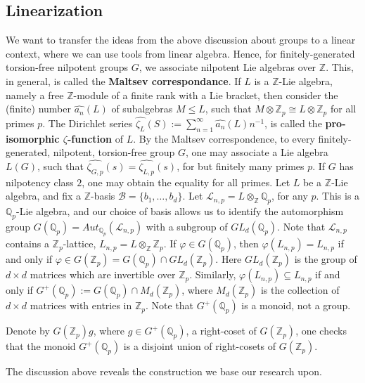 \documentclass[12pt]{article}
\begin{document}
\subsection{Linearization}
We want to transfer the ideas from the above discussion about groups to a linear context, where we can use tools from linear algebra.
Hence, for finitely-generated torsion-free nilpotent groups $G$, we associate nilpotent Lie algebras over $\mathbb{Z}$. This, in general, is called the \textbf{Maltsev correspondance}. 
If $L$ is a $\mathbb{Z}$-Lie algebra, namely a free $\mathbb{Z}$-module of a finite rank with a Lie bracket, then consider the (finite) number $\hat{a_n}(L)$ of subalgebras $M\leq L$, such that $M\otimes\mathbb{Z}_p\cong L\otimes\mathbb{Z}_p$ for all primes $p$. The Dirichlet series $\hat{\zeta_L}(S):=\sum_{n=1}^{\infty}\hat{a_n}(L)n^{-1}$, is called the \textbf{pro-isomorphic $\zeta$-function} of $L$. By the Maltsev correspondence, to every finitely-generated, nilpotent, torsion-free group $G$, one may associate a Lie algebra $L(G)$, such that $\hat{\zeta_{G,p}}(s)=\hat{\zeta_{L,p}}(s)$, for but finitely many primes $p$. If $G$ has nilpotency class $2$, one may obtain the equality for all primes. Let $L$ be a $\mathbb{Z}$-Lie algebra, and fix a $\mathbb{Z}$-basis $\mathcal{B}=\{b_1,\dots,b_d\}$. Let $\mathcal{L}_{n,p}=L\otimes_{\mathbb{Z}}\mathbb{Q}_p$, for any $p$. This is a $\mathbb{Q}_p$-Lie algebra, and our choice of basis allows us to identify the automorphism group $G(\mathbb{Q}_p)=Aut_{\mathbb{Q}_p}(\mathcal{L}_{n,p})$ with a subgroup of $GL_d(\mathbb{Q}_p)$. Note that $\mathcal{L}_{n,p}$ contains a $\mathbb{Z}_p$-lattice, $L_{n,p}=L\otimes_{\mathbb{Z}}\mathbb{Z}_p$. If $\varphi\in G(\mathbb{Q}_p)$, then $\varphi(L_{n,p})=L_{n,p}$ if and only if $\varphi\in G(\mathbb{Z}_p)=G(\mathbb{Q}_p)\cap GL_d(\mathbb{Z}_p)$. Here $GL_d(\mathbb{Z}_p)$ is the group of $d\times d$ matrices which are invertible over $\mathbb{Z}_p$. Similarly, $\varphi(L_{n,p})\subseteq L_{n,p}$ if and only if $G^{+}(\mathbb{Q}_p):=G(\mathbb{Q}_p)\cap M_d(\mathbb{Z}_p)$, where $M_d(\mathbb{Z}_p)$ is the collection of $d\times d$ matrices with entries in $\mathbb{Z}_p$. Note that $G^{+}(\mathbb{Q}_p)$ is a monoid, not a group.\par
Denote by $G(\mathbb{Z}_p)g$, where $g\in G^{+}(\mathbb{Q}_p)$, a right-coset of $G(\mathbb{Z}_p)$, one checks that the monoid $G^{+}(\mathbb{Q}_p)$ is a disjoint union of right-cosets of $G(\mathbb{Z}_p)$.\par
The discussion above reveals the construction we base our research upon.
\end{document}
